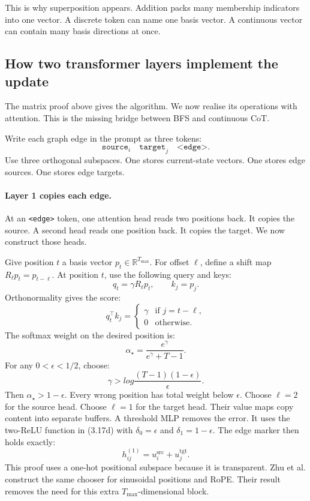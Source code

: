 \documentclass[11pt]{article}
\theoremstyle{definition}
\begin{document}
This is why superposition appears. Addition packs many membership indicators into one vector. A discrete token can name one basis vector. A continuous vector can contain many basis directions at once.

\subsection{How two transformer layers implement the update}

The matrix proof above gives the algorithm. We now realise its operations with attention. This is the missing bridge between BFS and continuous CoT.

Write each graph edge in the prompt as three tokens:
\[
\texttt{source}_i\quad \texttt{target}_j\quad \texttt{<edge>}.
\tag{3.13}
\]
Use three orthogonal subspaces. One stores current-state vectors. One stores edge sources. One stores edge targets.

\paragraph{Layer 1 copies each edge.} At an \texttt{<edge>} token, one attention head reads two positions back. It copies the source. A second head reads one position back. It copies the target. We now construct those heads.

Give position $t$ a basis vector $p_t\in\mathbb R^{T_{\max}}$. For offset $\ell$, define a shift map $R_\ell p_t=p_{t-\ell}$. At position $t$, use the following query and keys:
\[
q_t=\gamma R_\ell p_t,
\qquad k_j=p_j.
\tag{3.14a}
\]
Orthonormality gives the score:
\[
q_t^\top k_j=
\begin{cases}
\gamma & \text{if }j=t-\ell,\\
0 & \text{otherwise.}
\end{cases}
\tag{3.14b}
\]
The softmax weight on the desired position is:
\[
\alpha_\star=
\frac{e^\gamma}{e^\gamma+T-1}.
\tag{3.14c}
\]
For any $0<\epsilon<1/2$, choose:
\[
\gamma>log\frac{(T-1)(1-\epsilon)}{\epsilon}.
\tag{3.14d}
\]
Then $\alpha_\star>1-\epsilon$. Every wrong position has total weight below $\epsilon$. Choose $\ell=2$ for the source head. Choose $\ell=1$ for the target head. Their value maps copy content into separate buffers. A threshold MLP removes the error. It uses the two-ReLU function in (3.17d) with $\delta_0=\epsilon$ and $\delta_1=1-\epsilon$. The edge marker then holds exactly:
\[
h_{ij}^{(1)}=u_i^{\mathrm{src}}+u_j^{\mathrm{tgt}}.
\tag{3.14}
\]
This proof uses a one-hot positional subspace because it is transparent. Zhu et al. construct the same chooser for sinusoidal positions and RoPE. Their result removes the need for this extra $T_{\max}$-dimensional block.
\end{document}
